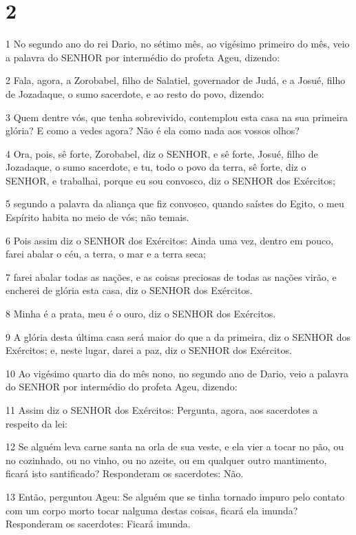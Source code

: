 \chapter{2}

\par 1 No segundo ano do rei Dario, no sétimo mês, ao vigésimo primeiro do mês, veio a palavra do SENHOR por intermédio do profeta Ageu, dizendo:
\par 2 Fala, agora, a Zorobabel, filho de Salatiel, governador de Judá, e a Josué, filho de Jozadaque, o sumo sacerdote, e ao resto do povo, dizendo:
\par 3 Quem dentre vós, que tenha sobrevivido, contemplou esta casa na sua primeira glória? E como a vedes agora? Não é ela como nada aos vossos olhos?
\par 4 Ora, pois, sê forte, Zorobabel, diz o SENHOR, e sê forte, Josué, filho de Jozadaque, o sumo sacerdote, e tu, todo o povo da terra, sê forte, diz o SENHOR, e trabalhai, porque eu sou convosco, diz o SENHOR dos Exércitos;
\par 5 segundo a palavra da aliança que fiz convosco, quando saístes do Egito, o meu Espírito habita no meio de vós; não temais.
\par 6 Pois assim diz o SENHOR dos Exércitos: Ainda uma vez, dentro em pouco, farei abalar o céu, a terra, o mar e a terra seca;
\par 7 farei abalar todas as nações, e as coisas preciosas de todas as nações virão, e encherei de glória esta casa, diz o SENHOR dos Exércitos.
\par 8 Minha é a prata, meu é o ouro, diz o SENHOR dos Exércitos.
\par 9 A glória desta última casa será maior do que a da primeira, diz o SENHOR dos Exércitos; e, neste lugar, darei a paz, diz o SENHOR dos Exércitos.
\par 10 Ao vigésimo quarto dia do mês nono, no segundo ano de Dario, veio a palavra do SENHOR por intermédio do profeta Ageu, dizendo:
\par 11 Assim diz o SENHOR dos Exércitos: Pergunta, agora, aos sacerdotes a respeito da lei:
\par 12 Se alguém leva carne santa na orla de sua veste, e ela vier a tocar no pão, ou no cozinhado, ou no vinho, ou no azeite, ou em qualquer outro mantimento, ficará isto santificado? Responderam os sacerdotes: Não.
\par 13 Então, perguntou Ageu: Se alguém que se tinha tornado impuro pelo contato com um corpo morto tocar nalguma destas coisas, ficará ela imunda? Responderam os sacerdotes: Ficará imunda.
